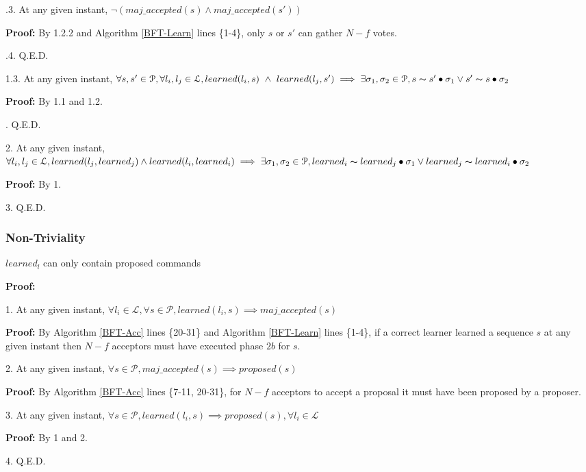 \indent\indent\indent\indent{}.3. At any given instant, $\neg (maj\_accepted(s) \land maj\_accepted(s'))$ \par
\indent\indent\indent\indent\indent\indent\parbox{\linewidth-\algorithmicindent*6}{\textbf{Proof:} By 1.2.2 and Algorithm \ref{BFT-Learn} lines \{1-4\}, only $s$ or $s'$ can gather $N-f$ votes.}\par
\indent\indent\indent\indent{}.4. Q.E.D. \par
\indent\indent\indent \parbox{\linewidth-\algorithmicindent*3}{1.3. At any given instant, $\forall s,s' \in \mathcal{P}, \forall l_i,l_j \in \mathcal{L}, learned(l_i,s)\ \land\ learned(l_j,s') \implies \exists \sigma_1,\sigma_2 \in \mathcal{P}, s \thicksim s' \bullet \sigma_1 \lor s' \thicksim s \bullet \sigma_2$ }\par
\indent\indent\indent\indent\textbf{Proof:} By 1.1 and 1.2.\par
\indent\indent{}. Q.E.D. \par
\parbox{\linewidth-\algorithmicindent*3}{2. At any given instant, $\forall l_i,l_j \in \mathcal{L}, learned(l_j,learned_j) \land learned(l_i,learned_i) \implies \exists \sigma_1,\sigma_2 \in \mathcal{P}, learned_i \thicksim learned_j \bullet \sigma_1 \lor learned_j \thicksim learned_i \bullet \sigma_2$}\par
\indent\indent\textbf{Proof:} By 1.\par
3. Q.E.D. \par

\subsubsection{Non-Triviality}
\begin{theorem}
$learned_l$ can only contain proposed commands \label{N-T1} \par
\end{theorem} 
\textbf{Proof:} \par
1. At any given instant, $\forall l_i \in \mathcal{L}, \forall s \in \mathcal{P}, learned(l_i,s) \implies maj\_accepted(s)$ \par
\indent\indent\parbox{\linewidth}{\textbf{Proof:} By Algorithm \ref{BFT-Acc} lines \{20-31\} and Algorithm \ref{BFT-Learn} lines \{1-4\}, if a correct learner learned a sequence $s$ at any given instant then $N-f$ acceptors must have executed phase $2b$ for $s$.}\par
2. At any given instant, $\forall s \in \mathcal{P}, maj\_accepted(s) \implies proposed(s)$ \par
\indent\indent\parbox{\linewidth}{\textbf{Proof:} By Algorithm \ref{BFT-Acc} lines \{7-11, 20-31\}, for $N-f$ acceptors to accept a proposal it must have been proposed by a proposer.}\par
3. At any given instant, $\forall s \in \mathcal{P}, learned(l_i,s) \implies proposed(s),\forall l_i \in \mathcal{L}$ \par
\indent\indent\textbf{Proof:} By 1 and 2. \par
4. Q.E.D. \par

